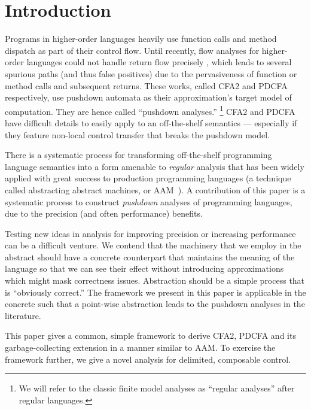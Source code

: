 
\section{Introduction}

Programs in higher-order languages heavily use function calls and method dispatch as part of their control flow.
%
Until recently, flow analyses for higher-order languages could not handle return flow precisely \citep{ianjohnson:vardoulakis-lmcs11, dvanhorn:Earl2010Pushdown}, which leads to several spurious paths (and thus false positives) due to the pervasiveness of function or method calls and subsequent returns.
%
These works, called CFA2 and PDCFA respectively, use pushdown automata as their approximation's target model of computation.
%
They are hence called ``pushdown analyses.''
%
\footnote{We will refer to the classic finite model analyses as ``regular analyses'' after regular languages.}
%
CFA2 and PDCFA have difficult details to easily apply to an off-the-shelf semantics --- especially if they feature non-local control transfer that breaks the pushdown model.

There is a systematic process for transforming off-the-shelf programming language semantics into a form amenable to \emph{regular} analysis that has been widely applied with great success to production programming languages (a technique called abstracting abstract machines, or AAM~\citep{dvanhorn:VanHorn2010Abstracting}).
%
A contribution of this paper is a systematic process to construct \emph{pushdown} analyses of programming languages, due to the precision (and often performance) benefits.
%


Testing new ideas in analysis for improving precision or increasing performance can be a difficult venture.
%
We contend that the machinery that we employ in the abstract should have a concrete counterpart that maintains the meaning of the language so that we can see their effect without introducing approximations which might mask correctness issues.
%
Abstraction should be a simple process that is ``obviously correct.''
%
The framework we present in this paper is applicable in the concrete such that a point-wise abstraction leads to the pushdown analyses in the literature.

This paper gives a common, simple framework to derive CFA2, PDCFA and its garbage-collecting extension in a manner similar to AAM.
%
To exercise the framework further, we give a novel analysis for delimited, composable control. \\

